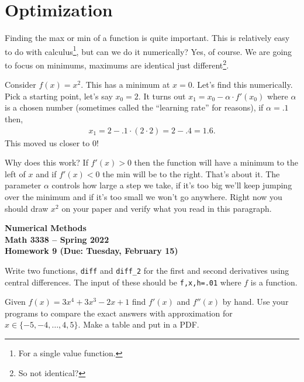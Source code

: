 \documentclass[11pt,letterpaper]{article}
\newcommand{\semester}{Spring 2022}
\newcommand{\due}{Tuesday, February 15}
\begin{document}
\section{Optimization}
Finding the max or min of a function is quite important. This is relatively easy to do with calculus\footnote{For a single value function.}, but can we do it numerically? Yes, of course. We are going to focus on minimums, maximums are identical just different\footnote{So not identical?}. 

Consider $f(x) = x^2$. This has a minimum at $x=0$. Let's find this numerically. Pick a starting point, let's say $x_0=2$. It turns out $x_1 = x_0 - \alpha\cdot f'(x_0)$ where $\alpha$ is a chosen number (sometimes called the ``learning rate'' for reasons), if $\alpha = .1$ then,
\begin{align*}
 x_1 = 2 - .1\cdot (2\cdot 2) = 2-.4 = 1.6.
\end{align*}
This moved us closer to 0!

Why does this work? If $f'(x)>0$ then the function will have a minimum to the left of $x$ and if $f'(x)<0$ the min will be to the right. That's about it. The parameter $\alpha$ controls how large a step we take, if it's too big we'll keep jumping over the minimum and if it's too small we won't go anywhere. Right now you should draw $x^2$ on your paper and verify what you read in this paragraph. 















\newpage

\begin{center}
{\huge{\bf  Numerical Methods}} \\[1.5ex]
{\bf Math 3338 -- \semester}\\[1.5ex]
{\Large{\bf Homework 9 (Due: \due)}}\\
\end{center}
\vspace{2mm}

\begin{problem}
 Write two functions, \texttt{diff} and \texttt{diff\_2} for the first and second derivatives using
central differences. The input of these should be \texttt{f,x,h=.01} where $f$ is a function.
\end{problem}

\begin{problem}
 Given $f(x) = 3x^4+3x^3-2x+1$ find $f'(x)$ and $f''(x)$ by hand. Use your programs to compare the exact answers with approximation for $x\in\{-5,-4,\dots,4,5\}$. Make a table and put in a PDF.
\end{problem}
\end{document}

